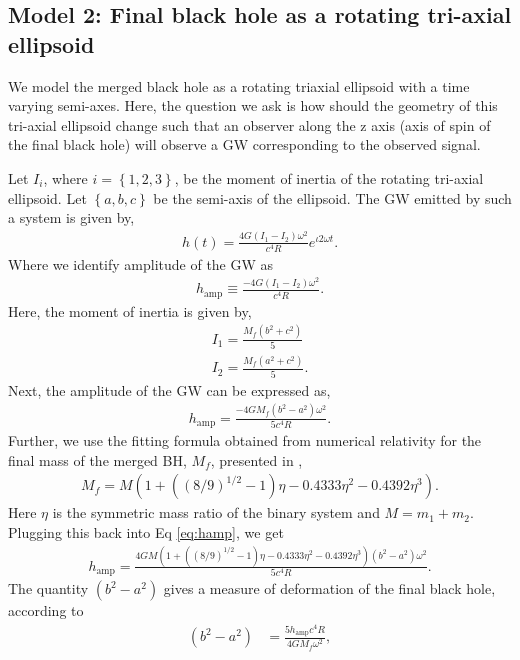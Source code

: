 \subsection{Model 2: Final black hole as a rotating tri-axial ellipsoid} 
\label{sec:model2}
We model the merged black hole as a rotating triaxial ellipsoid with a time varying semi-axes. Here, the question we ask is how should the geometry of this tri-axial ellipsoid change such that an observer along the z axis (axis of spin of the final black hole) will observe a GW corresponding to the observed signal. 

Let $I_{i}$, where $i = \left\lbrace 1,2,3 \right\rbrace $, be the moment of inertia of the rotating tri-axial ellipsoid. Let $\left\lbrace a,b,c \right\rbrace$ be the semi-axis of the ellipsoid. The GW emitted by such a system is given by,
\begin{align}
h(t)=\frac{4 G (I_{1}-I_{2}) \omega^{2}}{c^4 R} e^{\iota 2\omega t}.
\end{align}
Where we identify amplitude of the GW as
\begin{align}
h_{\mathrm{amp}}\equiv \frac{-4 G (I_{1}-I_{2}) \omega^{2}}{c^4 R}.
\end{align}
Here, the moment of inertia is given by, 
\begin{align}
I_{1}=\frac{M_{f} (b^{2}+c^{2})}{5}
\\I_{2}=\frac{M_{f} (a^{2}+c^{2})}{5}.
\end{align}
Next, the amplitude of the GW can be expressed as,
\begin{align}
\label{eq:hamp}
h_{\mathrm{amp}}=\frac{-4 G M_{f} (b^{2}-a^{2}) \omega^{2}}{5 c^4 R}.
\end{align}
Further, we use the fitting formula obtained from numerical relativity for the final mass of the merged BH, $M_{f}$, presented in \cite{2011PhRvD..84l4052P},
\begin{align}
M_{f}=M  (1+ ((8/9)^{1/2} -1)\eta -0.4333 \eta^{2} -0.4392 \eta^{3}).
\end{align}
Here $\eta$ is the symmetric mass ratio of the binary system and $M=m_{1}+m_{2}$.
Plugging this back into Eq \ref{eq:hamp}, we get 
\begin{align}
h_{\mathrm{amp}}=\frac{4 G M  (1+ ((8/9)^{1/2} -1)\eta -0.4333 \eta^{2} -0.4392 \eta^{3}) (b^{2}-a^{2}) \omega^{2}}{5 c^4 R}.
\end{align}
The quantity $(b^{2}-a^{2})$ gives a measure of deformation of the final black hole, according to
\begin{align}
(b^{2}-a^{2}) &= \frac{5 h_{\mathrm{amp}} c^4 R}{4 G M_{f}\omega^{2}},
\end{align}
